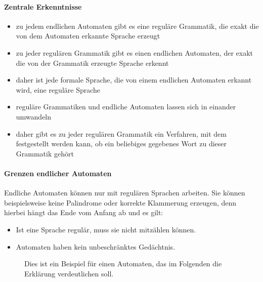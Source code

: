 \documentclass{article}
\begin{document}
	\paragraph{Zentrale Erkenntnisse}
	\begin{itemize}
		\item zu jedem endlichen Automaten gibt es eine reguläre Grammatik, die exakt die von dem Automaten erkannte Sprache erzeugt
		\item zu jeder regulären Grammatik gibt es einen endlichen Automaten, der exakt die von der Grammatik erzeugte Sprache erkennt
		\item daher ist jede formale Sprache, die von einem endlichen Automaten erkannt wird, eine reguläre Sprache
		\item reguläre Grammatiken und endliche Automaten lassen sich in einander umwandeln
		\item daher gibt es zu jeder regulären Grammatik ein Verfahren, mit dem festgestellt werden kann, ob ein beliebiges gegebenes Wort zu dieser Grammatik gehört
	\end{itemize}
	
	\paragraph{Grenzen endlicher Automaten}
	Endliche Automaten können nur mit regulären Sprachen arbeiten. Sie können beispielsweise keine Palindrome oder korrekte Klammerung erzeugen, denn hierbei hängt das Ende vom Anfang ab und es gilt:
	\begin{itemize}
		\item Ist eine Sprache regulär, muss sie nicht mitzählen können.
		\item Automaten haben kein unbeschränktes Gedächtnis.
	\end{itemize}
	
	\begin{figure}[H]
		\centering
		
		\caption{Dies ist ein Beispiel für einen Automaten, das im Folgenden die Erklärung verdeutlichen soll.}
	\end{figure}	
		
\end{document}
